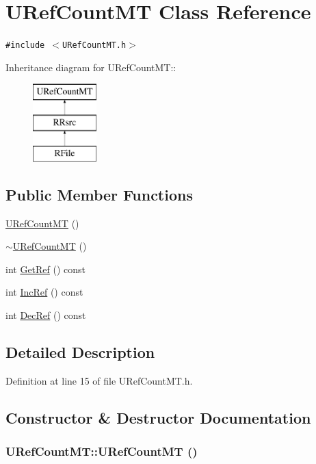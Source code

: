 \hypertarget{class_u_ref_count_m_t}{
\section{URefCountMT Class Reference}
\label{class_u_ref_count_m_t}
}
{\tt \#include $<$URefCountMT.h$>$}

Inheritance diagram for URefCountMT::\begin{figure}[H]
\begin{center}
\leavevmode
\includegraphics[height=3cm]{class_u_ref_count_m_t}
\end{center}
\end{figure}
\subsection*{Public Member Functions}
\begin{CompactItemize}
\item 
\hyperlink{class_u_ref_count_m_t_66d87d8f97b8a785a9652145fb3eb0a9}{URefCountMT} ()
\item 
\hyperlink{class_u_ref_count_m_t_5665b1a7bd2ea47b997741ab1f4f5cc2}{$\sim$URefCountMT} ()
\item 
int \hyperlink{class_u_ref_count_m_t_6333c7b0d85515845f21b40bd80439c3}{GetRef} () const 
\item 
int \hyperlink{class_u_ref_count_m_t_6af6b14c67a941e1c337ae6fc6a85b13}{IncRef} () const 
\item 
int \hyperlink{class_u_ref_count_m_t_1a9d20fb2bb9d7066f6ca79f00dde9a3}{DecRef} () const 
\end{CompactItemize}


\subsection{Detailed Description}


Definition at line 15 of file URefCountMT.h.

\subsection{Constructor \& Destructor Documentation}
\hypertarget{class_u_ref_count_m_t_66d87d8f97b8a785a9652145fb3eb0a9}{
\subsubsection[{URefCountMT}]{\setlength{\rightskip}{0pt plus 5cm}URefCountMT::URefCountMT ()}}
\label{class_u_ref_count_m_t_66d87d8f97b8a785a9652145fb3eb0a9}




